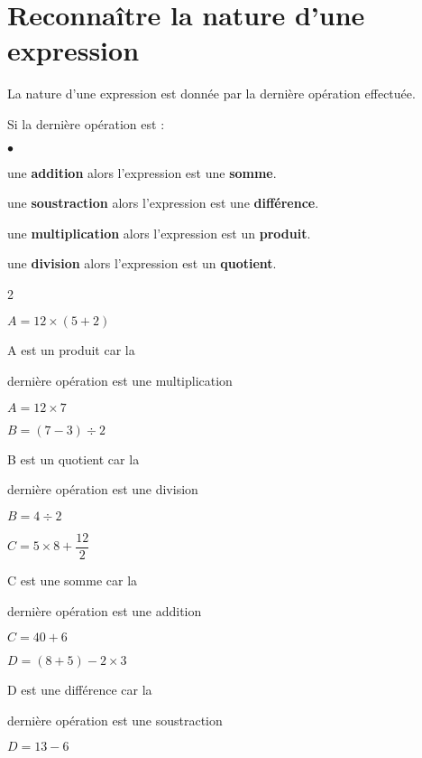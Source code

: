 \section{Reconnaître la nature d'une expression}

\begin{propriete}[\admise]
    La nature d'une expression est donnée par la dernière opération effectuée.\par
    Si la dernière opération est :
    \begin{list}{$\bullet$}{}
        \item une \textbf{addition} alors l'expression est une \textbf{somme}.
        \item une \textbf{soustraction} alors l'expression est une \textbf{différence}.
        \item une \textbf{multiplication} alors l'expression est un \textbf{produit}.
        \item une \textbf{division} alors l'expression est un \textbf{quotient}.
    \end{list}
\end{propriete}

\begin{exemple*1}
    \begin{multicols}2
        \begin{list}{}{}
        \item $A=12\times (5+2)$
        \item A est un produit car la 
        \item dernière opération est une multiplication
        \item $A=12\times7$
        \item 
        \item $B=(7-3)\div2$
        \item B est un quotient car la 
        \item dernière opération est une division
        \item $B=4\div2$
        \item 
        \item $C=5\times 8 + \dfrac{12}2$
        \item C est une somme car la 
        \item dernière opération est une addition
        \item $C=40+6$
        \item 
        \item $D=(8+5)-2\times3$
        \item D est une différence car la 
        \item dernière opération est une soustraction
        \item $D=13-6$
        \item 
        \end{list}
    \end{multicols}
\end{exemple*1}